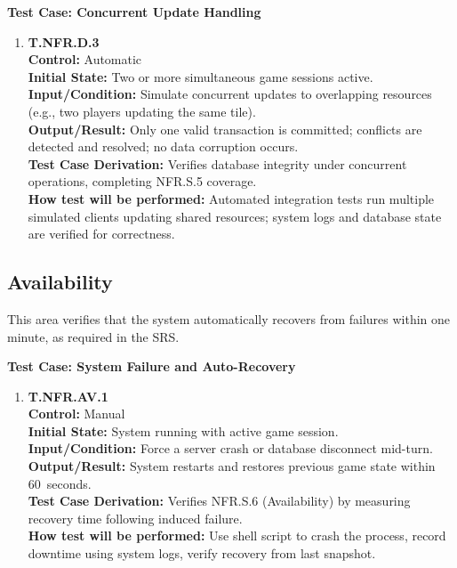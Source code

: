 \documentclass[12pt, titlepage]{article}
\begin{document}
\textbf{Test Case: Concurrent Update Handling}

\begin{enumerate}
\item \textbf{T.NFR.D.3} \\
\textbf{Control:} Automatic \\
\textbf{Initial State:} Two or more simultaneous game sessions active. \\
\textbf{Input/Condition:} Simulate concurrent updates to overlapping resources (e.g., two players updating the same tile). \\
\textbf{Output/Result:} Only one valid transaction is committed; conflicts are detected and resolved; no data corruption occurs. \\
\textbf{Test Case Derivation:} Verifies database integrity under concurrent operations, completing NFR.S.5 coverage. \\
\textbf{How test will be performed:} Automated integration tests run multiple simulated clients updating shared resources; system logs and database state are verified for correctness.
\end{enumerate}


\subsection{Availability}

This area verifies that the system automatically recovers from failures within one minute, as required in the SRS.

\textbf{Test Case: System Failure and Auto-Recovery}

\begin{enumerate}
\item \textbf{T.NFR.AV.1} \\
\textbf{Control:} Manual \\
\textbf{Initial State:} System running with active game session. \\
\textbf{Input/Condition:} Force a server crash or database disconnect mid-turn. \\
\textbf{Output/Result:} System restarts and restores previous game state within 60~seconds. \\
\textbf{Test Case Derivation:} Verifies NFR.S.6 (Availability) by measuring recovery time following induced failure. \\
\textbf{How test will be performed:} Use shell script to crash the process, record downtime using system logs, verify recovery from last snapshot.
\end{enumerate}
\end{document}
